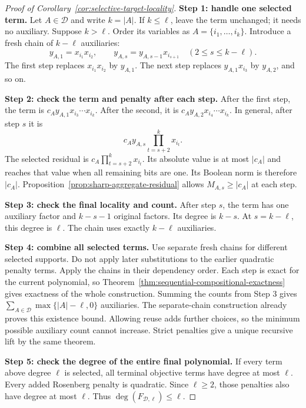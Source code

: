 \documentclass[a4paper,onecolumn,11pt,unpublished]{quantumarticle}
\theoremstyle{remark}
\begin{document}
\begin{proof}[Proof of Corollary~\ref{cor:selective-target-locality}]
\textbf{Step 1: handle one selected term.}
Let $A\in\mathcal D$ and write $k=|A|$.
If $k\leq\ell$, leave the term unchanged; it needs no auxiliary.
Suppose $k>\ell$. Order its variables as $A=\{i_1,\ldots,i_k\}$.
Introduce a fresh chain of $k-\ell$ auxiliaries:
\begin{equation}
  y_{A,1}=x_{i_1}x_{i_2},
  \qquad
  y_{A,s}=y_{A,s-1}x_{i_{s+1}}
  \quad(2\leq s\leq k-\ell).
  \label{eq:fresh-chain}
\end{equation}
The first step replaces $x_{i_1}x_{i_2}$ by $y_{A,1}$.
The next step replaces $y_{A,1}x_{i_3}$ by $y_{A,2}$, and so on.

\textbf{Step 2: check the term and penalty after each step.}
After the first step, the term is
$c_Ay_{A,1}x_{i_3}\cdots x_{i_k}$.
After the second, it is $c_Ay_{A,2}x_{i_4}\cdots x_{i_k}$.
In general, after step $s$ it is
\begin{equation}
  c_Ay_{A,s}\prod_{t=s+2}^{k}x_{i_t}.
  \label{eq:fresh-chain-descendant}
\end{equation}
The selected residual is $c_A\prod_{t=s+2}^{k}x_{i_t}$.
Its absolute value is at most $|c_A|$ and reaches that value when all
remaining bits are one. Its Boolean norm is therefore $|c_A|$.
Proposition~\ref{prop:sharp-aggregate-residual} allows
$M_{A,s}\geq|c_A|$ at each step.

\textbf{Step 3: check the final locality and count.}
After step $s$, the term has one auxiliary factor and $k-s-1$ original
factors. Its degree is $k-s$.
At $s=k-\ell$, this degree is $\ell$.
The chain uses exactly $k-\ell$ auxiliaries.

\textbf{Step 4: combine all selected terms.}
Use separate fresh chains for different selected supports.
Do not apply later substitutions to the earlier quadratic penalty terms.
Apply the chains in their dependency order.
Each step is exact for the current polynomial, so
Theorem~\ref{thm:sequential-compositional-exactness} gives exactness of the
whole construction. Summing the counts from Step 3 gives
$\sum_{A\in\mathcal D}\max\{|A|-\ell,0\}$ auxiliaries.
The separate-chain construction already proves this existence bound.
Allowing reuse adds further choices, so the minimum possible auxiliary count
cannot increase. Strict penalties give a unique recursive lift by the same
theorem.

\textbf{Step 5: check the degree of the entire final polynomial.}
If every term above degree $\ell$ is selected, all terminal objective terms
have degree at most $\ell$. Every added Rosenberg penalty is quadratic.
Since $\ell\geq2$, those penalties also have degree at most $\ell$.
Thus $\deg(F_{\mathcal D,\ell})\leq\ell$.
\end{proof}
\end{document}
